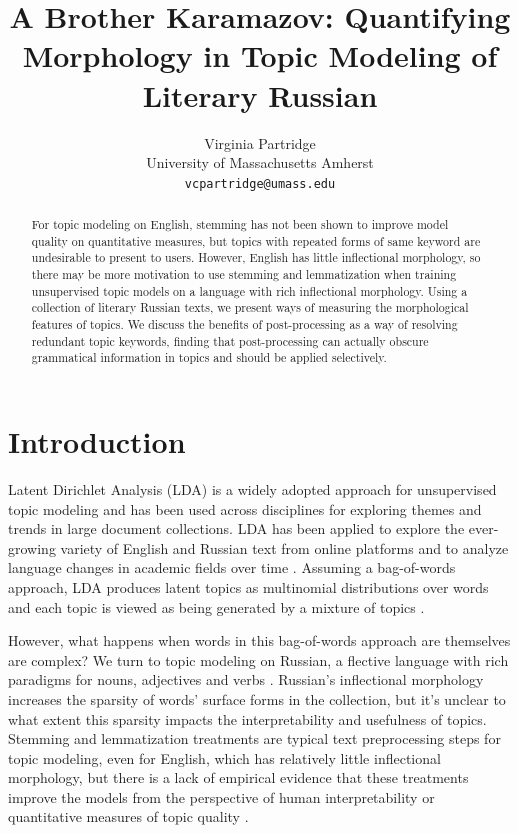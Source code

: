 \documentclass[11pt,a4paper]{article}
\title{A Brother Karamazov: Quantifying Morphology in Topic Modeling of Literary Russian}
\author{Virginia Partridge \\
  University of Massachusetts Amherst\\
  \texttt{vcpartridge@umass.edu}
}
\date{}
\begin{document}
\maketitle
\begin{abstract}
For topic modeling on English, stemming has not been shown to improve model quality on quantitative measures, but topics with repeated forms of same keyword are undesirable to present to users. However, English has little inflectional morphology, so there may be more motivation to use stemming and lemmatization when training unsupervised topic models on a language with rich inflectional morphology. Using a collection of literary Russian texts, we present ways of measuring the morphological features of topics. We discuss the benefits of post-processing as a way of resolving redundant topic keywords, finding that post-processing can actually obscure grammatical information in topics and should be applied selectively.
\end{abstract}

\section{Introduction}
Latent Dirichlet Analysis (LDA) is a widely adopted approach for unsupervised topic modeling and has been used across disciplines for exploring themes and trends in large document collections. LDA has been applied to explore the ever-growing variety of English and Russian text from online platforms and to analyze language changes in academic fields over time \cite{koltsova2013,mcfarland2013differentiating, vogel-jurafsky-2012-said, mitrofanova2015probabilistic}. Assuming a bag-of-words approach, LDA produces latent topics as multinomial distributions over words and each topic is viewed as being generated by a mixture of topics \cite{blei2003,steyvers2007probabilistic}.

However, what happens when words in this bag-of-words approach are themselves are complex? We turn to topic modeling on Russian, a flective language with rich paradigms for nouns, adjectives and verbs \cite{wade2020comprehensive}. Russian's inflectional morphology increases the sparsity of words' surface forms in the collection, but it's unclear to what extent this sparsity impacts the interpretability and usefulness of topics. Stemming and lemmatization treatments are typical text preprocessing steps for topic modeling, even for English, which has relatively little inflectional morphology, but there is a lack of empirical evidence that these treatments improve the models from the perspective of human interpretability or quantitative measures of topic quality \cite{schofield-mimno-2016-comparing}.
\end{document}
